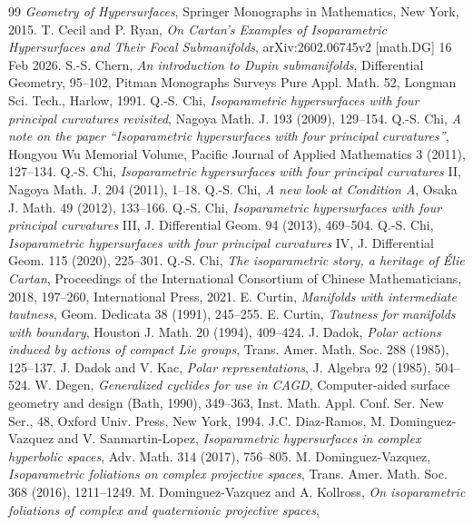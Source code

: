 \documentclass[12pt]{article}
\begin{document}
{\begin{thebibliography}{99}
{\em Geometry of Hypersurfaces}, Springer Monographs in Mathematics, New York, 2015.
 T. Cecil and P. Ryan,  {\em  On Cartan's Examples of Isoparametric Hypersurfaces and Their Focal Submanifolds},
arXiv:2602.06745v2 [math.DG] 16 Feb 2026.
 S.-S. Chern, {\em An introduction to Dupin submanifolds},
Differential Geometry, 95--102, Pitman Monographs Surveys Pure
Appl. Math. 52, Longman Sci. Tech., Harlow, 1991.
 Q.-S. Chi, {\em Isoparametric hypersurfaces with four principal curvatures revisited}, 
Nagoya Math. J. 193 (2009), 129--154.
   Q.-S. Chi, {\em A note on the paper ``Isoparametric hypersurfaces with four principal curvatures''}, 
Hongyou Wu Memorial Volume, Pacific Journal of Applied Mathematics 3 (2011), 127--134.
   Q.-S. Chi, {\em Isoparametric hypersurfaces with four principal curvatures} II, 
Nagoya Math. J. 204 (2011), 1--18.
   Q.-S. Chi, {\em A new look at Condition A}, 
Osaka J. Math. 49 (2012), 133--166.
   Q.-S. Chi, {\em Isoparametric hypersurfaces with four principal curvatures} III, 
J. Differential Geom. 94 (2013), 469--504.
   Q.-S. Chi, {\em Isoparametric hypersurfaces with four principal curvatures}  IV, 
J. Differential Geom. 115 (2020), 225--301.
 Q.-S. Chi, {\em The isoparametric story, a heritage of \'{E}lie Cartan}, 
Proceedings of the International Consortium of Chinese Mathematicians, 2018, 197--260,
International Press, 2021.
 E. Curtin, {\em Manifolds with intermediate tautness},
Geom. Dedicata 38 (1991), 245--255.
  E. Curtin, {\em  Tautness for manifolds
with boundary}, 
Houston J. Math. 20 (1994), 409--424.
 J. Dadok, {\em Polar actions induced by actions of compact Lie groups}, Trans. Amer. Math. Soc. 288 (1985), 125--137.
 J. Dadok and V. Kac, {\em Polar representations}, J. Algebra  92 (1985), 504--524.
 W. Degen, 
{\em Generalized cyclides for use in CAGD}, Computer-aided surface
geometry and design (Bath, 1990), 349--363, Inst. Math. Appl. Conf.
Ser. New Ser., 48, Oxford Univ. Press, New York, 1994.
J.C. Diaz-Ramos, M. Dominguez-Vazquez and V. Sanmartin-Lopez, {\em Isoparametric hypersurfaces in complex hyperbolic spaces}, Adv. Math. 314 (2017), 756--805.
M. Dominguez-Vazquez, {\em Isoparametric foliations on complex projective spaces}, Trans. Amer. Math. Soc. 368 (2016), 1211--1249.
M. Dominguez-Vazquez and A. Kollross, {\em On isoparametric foliations of complex and quaternionic projective spaces}, 

\end{thebibliography}}
\end{document}
